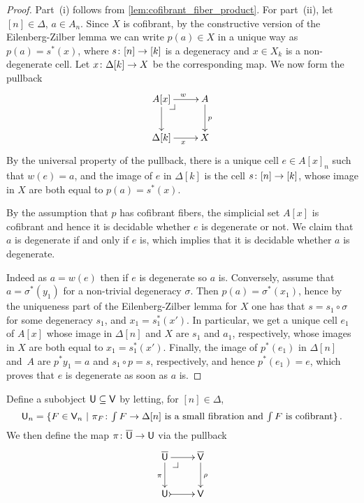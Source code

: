 \documentclass[reqno,10pt,a4paper,oneside,draft]{amsart}
\begin{document}
\begin{proof} Part~(i) follows from \cref{lem:cofibrant_fiber_product}. For part~(ii), let $[n] \in \Delta$, $a \in A_n$. Since $X$ is cofibrant, by the constructive version of the Eilenberg-Zilber lemma we can write $p(a) \in X$ in a unique way as $p(a) =s^*(x)$, where $s \colon [n] \to [k]$ is a degeneracy and 
$x \in X_k$ is a non-degenerate cell. Let $x \colon \Delta[k] \rightarrow X$ be the corresponding map. We now form the pullback
\[
\xymatrix{
A[x] \ar[r]^w \ar[d] \drpullback & A  \ar[d]^{p}  \\
\Delta[k] \ar[r]_{x} & X }
\]
By the universal property of the pullback, there is a unique cell $e \in A[x]_n$ such that $w(e)=a$, and the image of $e$ in $\Delta[k]$ is the cell $s \colon [n] \to [k]$, whose image in $X$ are both equal to $p(a)=s^*(x)$.

By the assumption that $p$ has cofibrant fibers, the simplicial set $A[x]$ is cofibrant and hence it is decidable whether $e$ is degenerate or not. We claim that $a$ is degenerate if and only if $e$ is, which implies that it is decidable whether $a$ is degenerate.

 Indeed as $a = w(e)$ then if $e$ is degenerate so $a$ is. Conversely, assume that $a=\sigma^*(y_1)$ for a non-trivial degeneracy $\sigma$. Then $p(a)=\sigma^*(x_1)$, hence by the uniqueness part of the Eilenberg-Zilber lemma for $X$ one has that $s=s_1 \circ \sigma$ for some degeneracy $s_1$, and $x_1 = s_1^*(x')$. In particular, we get a unique cell $e_1$ of $A[x]$ whose image in $\Delta[n]$ and $X$ are  $s_1$ and $a_1$, respectively, whose images in $X$ are both equal to $x_1=s_1^*(x')$. Finally, the image of $p^*(e_1)$ in $\Delta[n]$ and~$A$ are  $p^* y_1 =a$ and $s_1 \circ p =s$, respectively, and hence $p^*(e_1) =e$, which proves that $e$ is degenerate as soon as $a$ is.
\end{proof} 


Define a subobject $\mathsf{U} \subseteq \mathsf{V}$ by letting, for $[n] \in \Delta$, 
\[
\mathsf{U}_n = \{ F \in \mathsf{V}_n \ | \ \pi_F \colon \textstyle{\int F} \to \Delta[n] \text{ is a small fibration and 
$ \textstyle{\int F}$ is cofibrant} \} \, .
\]
We then define the map $\pi \colon \overline{\mathsf{U}} \to \mathsf{U}$ via the pullback 
\begin{equation}
\label{equ:def-of-pi}
\begin{gathered}
\xymatrix{
\UU \ar[r] \ar[d]_\pi \drpullback  & \VV \ar[d]^\rho \\
\U \ar@{>->}[r] & \V }
\end{gathered}
\end{equation}
\end{document}
